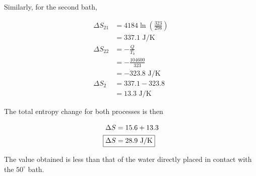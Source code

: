 \documentclass[9pt,a4paper,twocolumn]{article}
\begin{document}
Similarly, for the second bath,

\begin{align}
	\Delta S_{21} &= 4184\ln{\left( \frac{323}{298} \right)} \\
	&= 337.1 \textrm{ J/K} \\
	\Delta S_{22} &= -\frac{Q}{T_b} \\
	&= -\frac{104 600}{323} \\
	&= -323.8 \textrm{ J/K} \\
	\Delta S_2 &= 337.1 - 323.8 \\
	&= 13.3 \textrm{ J/K}
\end{align}

The total entropy change for both processes is then

\begin{align}
	\Delta S &= 15.6 + 13.3 \\
\Aboxed{\Delta S&= 28.9 \textrm{ J/K}} \label{eq:answer1}
\end{align}


The value obtained is less than that of the water directly placed in contact with the $50^\circ$ bath.
\end{document}
